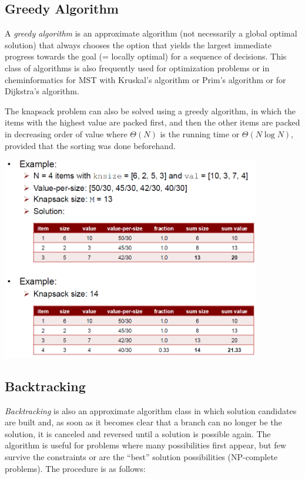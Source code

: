%

\subsection{Greedy Algorithm}

A \emph{greedy algorithm} is an approximate algorithm (not necessarily a global optimal solution) that always chooses the option that yields the largest immediate progress towards the goal (= locally optimal) for a sequence of decisions. This class of algorithms is also frequently used for optimization problems or in cheminformatics for MST with Kruskal's algorithm or Prim's algorithm or for Dijkstra's algorithm.

The knapsack problem can also be solved using a greedy algorithm, in which the items with the highest value are packed first, and then the other items are packed in decreasing order of value where $\Theta(N)$ is the running time or $\Theta(N\log N)$, provided that the sorting was done beforehand.

\begin{center}\includegraphics[width=0.85\textwidth]{img/algorithms/GreedyKnapsack.png}\end{center}

%

\subsection{Backtracking}

\emph{Backtracking} is also an approximate algorithm class in which solution candidates are built and, as soon as it becomes clear that a branch can no longer be the solution, it is canceled and reversed until a solution is possible again. The algorithm is useful for problems where many possibilities first appear, but few survive the constraints or are the “best” solution possibilities (NP-complete problems). The procedure is as follows:

